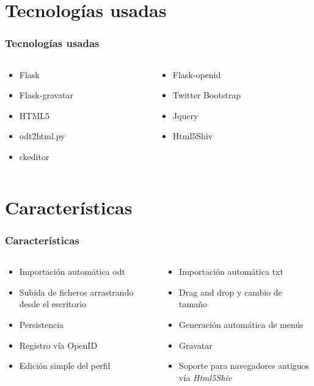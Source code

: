 \documentclass[utf8]{beamer}
\begin{document}
\section{Tecnologías usadas}
\begin{frame}
	\frametitle{Tecnologías usadas}
	\begin{columns}
		\begin{column}{5cm}
			\begin{itemize}
				\item<1->{Flask}
				\item<3->{Flask-gravatar}
				\item<5->{HTML5}
				\item<7->{odt2html.py}
				\item<9->{ckeditor}
			\end{itemize}
		\end{column}
		\begin{column}{5cm}
			\begin{itemize}
			  \item<2->{Flask-openid}
				\item<4->{Twitter Bootstrap}
				\item<6->{Jquery}
				\item<8->{Html5Shiv}
			\end{itemize}
		\end{column}
	\end{columns}
\end{frame}

\section{Características}
\begin{frame}
	\frametitle{Características}
	\begin{columns}
		\begin{column}{5cm}
			\begin{itemize}
				\item<1->{Importación automática odt}
				\item<3->{Subida de ficheros arrastrando desde el escritorio}
				\item<5->{Persistencia}
				\item<7->{Registro vía OpenID}
				\item<9->{Edición simple del perfil}
			\end{itemize}
		\end{column}
		\begin{column}{5cm}
			\begin{itemize}
			  \item<2->{Importación automática txt}
				\item<4->{Drag and drop y cambio de tamaño}
				\item<6->{Generación automática de menús}
				\item<8->{Gravatar}
				\item<10->{Soporte para navegadores antiguos vía \textit{Html5Shiv}}
			\end{itemize}
		\end{column}
	\end{columns}
\end{frame}
\end{document}
